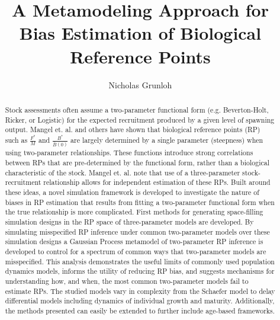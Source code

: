 \documentclass[12pt]{ucscthesis}
\title{A Metamodeling Approach for Bias Estimation of Biological Reference Points} %
\author{Nicholas Grunloh}
\begin{document}
%
\begin{frontmatter}

%
\maketitle
\copyrightpage
%
\tableofcontents
\listoffigures

%
\begin{abstract}
Stock assessments often assume a two-parameter functional form
(e.g. Beverton-Holt, Ricker, or Logistic) for the expected recruitment produced by a
given level of spawning output. Mangel et. al. \cite{mangel_perspective_2013} %
and others have shown that biological reference points (RP) such as $\frac{F^*}{M}$
and $\frac{B^*}{\bar{B}(0)}$ are largely determined by a single parameter
(steepness) when using two-parameter relationships. These functions introduce
strong correlations between RPs that are pre-determined by the functional form, 
rather than a biological characteristic of the stock. Mangel et. al. note that 
use of a three-parameter stock-recruitment relationship allows for independent 
estimation of these RPs. 
Built around these ideas, a novel simulation framework is developed to investigate  %
the nature of biases in RP estimation that results from fitting a 
two-parameter functional form when the true relationship is more complicated. %
First methods for generating space-filling simulation designs in the RP space of 
three-parameter models are developed. %
By simulating misspecified RP inference under common two-parameter models over 
these simulation designs a Gaussian Process metamodel of two-parameter RP 
inference is developed to control for a spectrum of common ways that two-parameter 
models are misspecified. 
This analysis demonstrates the useful limits of 
commonly used population dynamics models, informs the utility of reducing RP 
bias, and suggests mechanisms for understanding how, and when, the most common 
two-parameter models fail to estimate RPs.
The studied models vary in complexity from the Schaefer model to delay 
differential models including dynamics of individual growth and maturity. Additionally, 
the methods presented can easily be extended to further include age-based frameworks.



\end{abstract}
\end{frontmatter}
\end{document}

